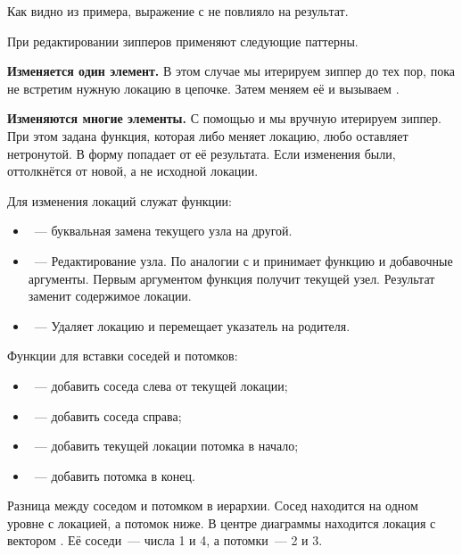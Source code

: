 Как видно из примера, выражение с  не повлияло на результат.

При редактировании зипперов применяют следующие паттерны.

\textbf{Изменяется один элемент.} В этом случае мы итерируем зиппер до тех пор, пока
не встретим нужную локацию в цепочке. Затем меняем её и вызываем .

\textbf{Изменяются многие элементы.} С помощью  и  мы вручную
итерируем зиппер. При этом задана функция, которая либо меняет локацию, любо
оставляет нетронутой. В форму  попадает  от её результата. Если
изменения были,  оттолкнётся от новой, а не исходной локации.

Для изменения локаций служат функции:

\begin{itemize}

\item
  ~--- буквальная замена текущего узла на другой.

\item
  ~--- Редактирование узла. По аналогии с  и  принимает
  функцию и добавочные аргументы. Первым аргументом функция получит текущей
  узел. Результат заменит содержимое локации.

\item
  ~--- Удаляет локацию и перемещает указатель на родителя.

\end{itemize}

Функции для вставки соседей и потомков:

\begin{itemize}

\item
  ~--- добавить соседа слева от текущей локации;

\item
  ~--- добавить соседа справа;

\item
  ~--- добавить текущей локации потомка в начало;

\item
  ~--- добавить потомка в конец.

\end{itemize}

Разница между соседом и потомком в иерархии. Сосед находится на одном уровне с
локацией, а потомок ниже. В центре диаграммы находится локация с вектором \code{[2
3]}. Её соседи~--- числа 1 и 4, а потомки~--- 2 и 3.

